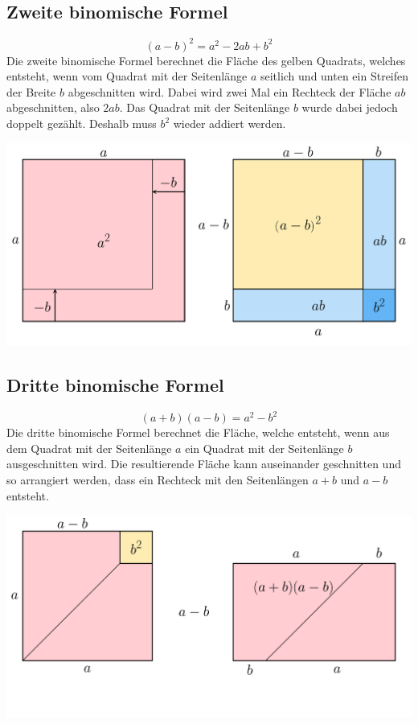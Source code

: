 \subsection{Zweite binomische Formel}
\[
  (a-b)^{2} = a^{2} - 2ab + b^{2}
\]
Die zweite binomische Formel berechnet die Fläche des gelben Quadrats, welches entsteht, wenn vom Quadrat mit der Seitenlänge $a$ seitlich und unten ein Streifen der Breite $b$ abgeschnitten wird. Dabei wird zwei Mal ein Rechteck der Fläche $ab$ abgeschnitten, also $2ab$. Das Quadrat mit der Seitenlänge $b$ wurde dabei jedoch doppelt gezählt. Deshalb muss $b^{2}$ wieder addiert werden.
\begin{center}
  \includegraphics[width=.8\textwidth]{Binomische Formel 2.pdf}
\end{center}

\subsection{Dritte binomische Formel}
\[
  (a+b)(a-b) = a^{2} - b^{2}
\]
Die dritte binomische Formel berechnet die Fläche, welche entsteht, wenn aus dem Quadrat mit der Seitenlänge $a$ ein Quadrat mit der Seitenlänge $b$ ausgeschnitten wird. Die resultierende Fläche kann auseinander geschnitten und so arrangiert werden, dass ein Rechteck mit den Seitenlängen $a+b$ und $a-b$ entsteht.
\begin{center}
  \includegraphics[width=.8\textwidth]{Binomische Formel 3.pdf}
\end{center}
